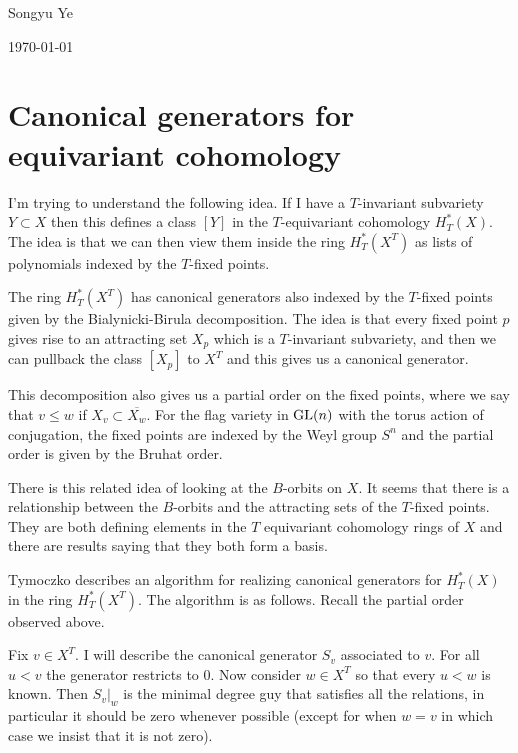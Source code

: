 \documentclass[12pt]{article}
\begin{document}
Songyu Ye

\today
\section{Canonical generators for equivariant cohomology}
I'm trying to understand the following idea. If I have a $T$-invariant subvariety $Y\subset X$ then
this defines a class $[Y]$ in the $T$-equivariant cohomology $H_T^*(X)$. The idea is that we can then
view them inside the ring $H_T^*(X^T)$ as lists of polynomials indexed by the $T$-fixed points.

\hfill

The ring $H_T^*(X^T)$ has canonical generators also indexed by the $T$-fixed points given by
the Bialynicki-Birula decomposition. The idea is that every fixed point $p$ gives rise to an attracting set
$X_p$ which is a $T$-invariant subvariety, and then we can pullback the class $[X_p]$ to $X^T$ and this gives
us a canonical generator.

\hfill

This decomposition also gives us a partial order on the fixed points,
where we say that $v\leq w$ if $X_v\subset \overline{X_w}$. For the flag variety in $\operatorname{GL}(n)$ with the torus action of
conjugation, the fixed points are indexed by the Weyl group $S^n$ and the partial order is given by the Bruhat order.

\hfill

There is this related idea of looking at the $B$-orbits on $X$. It seems that there is a
relationship between the $B$-orbits and the attracting sets of the $T$-fixed points. They are both defining
elements in the $T$ equivariant cohomology rings of $X$ and there are results saying that they both form a basis.


\hfill

Tymoczko describes an algorithm for realizing canonical generators for $H_T^*(X)$
in the ring $H_T^*(X^T)$. The algorithm is as follows. Recall the partial order observed above.

\hfill

Fix $v\in X^T$. I will describe the canonical generator $S_v$ associated to $v$. For all $u<v$ the generator restricts
to $0$. Now consider $w\in X^T$ so that every $u<w$ is known. Then $S_v\vert_w$ is the minimal degree guy that
satisfies all the relations, in particular it should be zero whenever possible (except for when $w = v$ in which
case we insist that it is not zero).
\end{document}
